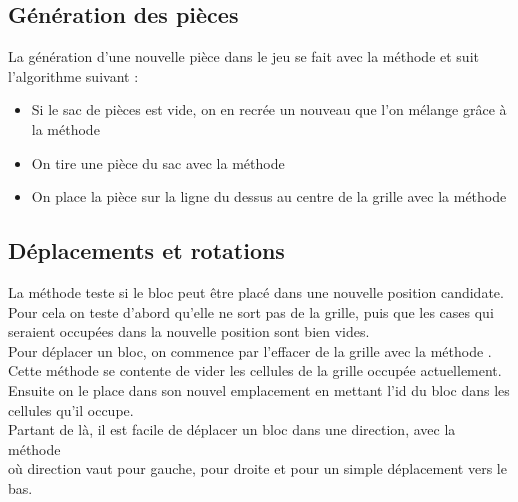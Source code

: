 \subsection{Génération des pièces}
La génération d'une nouvelle pièce dans le jeu se fait avec la méthode  et suit l'algorithme suivant :
\begin{itemize}
	\item Si le sac de pièces est vide, on en recrée un nouveau que l'on mélange grâce à la méthode 
	\item On tire une pièce du sac avec la méthode 
	\item On place la pièce sur la ligne du dessus au centre de la grille avec la méthode\\ 
\end{itemize}


\subsection{Déplacements et rotations}
La méthode  teste si le bloc peut être placé dans une nouvelle position candidate.\\
Pour cela on teste d'abord qu'elle ne sort pas de la grille, puis que les cases qui seraient occupées dans la nouvelle position sont bien vides.\\

Pour déplacer un bloc, on commence par l'effacer de la grille avec la méthode . Cette méthode se contente de vider les cellules de la grille occupée actuellement.\\
Ensuite on le place dans son nouvel emplacement en mettant l'id du bloc dans les cellules qu'il occupe. \\

Partant de là, il est facile de déplacer un bloc dans une direction, avec la méthode\\  où direction vaut  pour gauche,  pour droite et  pour un simple déplacement vers le bas.

